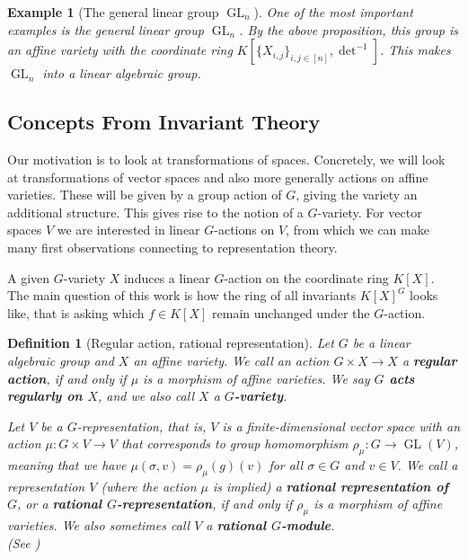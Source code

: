 \message{ !name(roughdraft.tex)}\documentclass[a4paper]{article}
\theoremstyle{prrt}
\newtheorem{definition}[theorem]{Definition}
\newtheorem{dexample}{Example}[theorem]
\begin{document}
\begin{dexample}[The general linear group $\operatorname{GL}_n$]
  One of the most important examples is the general linear group $\operatorname{GL}_n$.
  By the above proposition, this group is an affine variety with the coordinate ring $K[\{X_{i,j}\}_{i,j \in [n]}, \operatorname{det}^{-1}]$.
  This makes $\operatorname{GL}_n$ into a linear algebraic group.
\end{dexample}


\subsection{Concepts From Invariant Theory}

Our motivation is to look at transformations of spaces.
Concretely, we will look at transformations of vector spaces and also more generally actions on affine varieties.
These will be given by a group action of $G$, giving the variety an additional structure.
This gives rise to the notion of a $G$-variety.
For vector spaces $V$ we are interested in linear $G$-actions on $V$, from which we can make many first observations connecting to representation theory.

A given $G$-variety $X$ induces a linear $G$-action on the coordinate ring $K[X]$.
The main question of this work is how the ring of all invariants $K[X]^G$ looks like, that is asking which $f \in K[X]$ remain unchanged under the $G$-action.

\begin{definition}[Regular action, rational representation]
  Let $G$ be a linear algebraic group and $X$ an affine variety.
  We call an action $G \times X \rightarrow X$ a \textbf{regular action}, if and only if $\mu$ is a morphism of affine varieties.
  We say \textbf{$ G $ acts regularly on $ X $}, and we also call $X$ a \textbf{$G$-variety}.
  
  Let $V$ be a $G$-representation, that is, $V$ is a finite-dimensional vector space with an action $\mu \colon G \times V \rightarrow V$ that corresponds to group homomorphism $\rho_\mu \colon G \rightarrow \operatorname{GL}(V)$, meaning that we have $ \mu(\sigma,v) = \rho_{\mu}(g)(v)$ for all $\sigma \in G$ and $v \in V$.
  We call a representation $V$ (where the action $\mu$ is implied) a \textbf{rational representation of $G$}, or a \textbf{rational $G$-representation}, if and only if $\rho_\mu$ is a morphism of affine varieties.
  We also sometimes call $V$ a \textbf{rational $G$-module}.\\
  (See \cite[p.~31]{DK15})
  
\end{definition}
\end{document}
